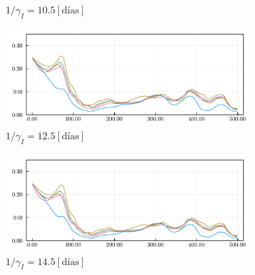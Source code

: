 \begin{figure}[H]
\begin{subfigure}[b]{.47\textwidth}
         \caption{\(1/\gamma_I = 10.5 [\text{días}]\)}
     \end{subfigure}
     \hfill
     \begin{subfigure}[b]{.47\textwidth}
         \centering
         \includegraphics[width=\textwidth]{img/resultados/sensigammai_12-5_0alphaini0-15_0-1_0-45_high1__acov0-8_aini0-27675_gcov0-05gamma_e_0-1724_gamma_i_0-1389_beta_2_2-0000.pdf}
         \caption{\(1/\gamma_I = 12.5 [\text{días}]\)}
     \end{subfigure}
     \hfill
     \begin{subfigure}[b]{.47\textwidth}
         \centering
         \includegraphics[width=\textwidth]{img/resultados/sensigammai_14-5_0alphaini0-15_0-1_0-45_high1__acov0-8_aini0-27675_gcov0-05gamma_e_0-1724_gamma_i_0-1389_beta_2_2-0000.pdf}
         \caption{\(1/\gamma_I = 14.5 [\text{días}]\)}
     \end{subfigure}
     \hfill
    \caption[Sensibilidad factor sanitario estimado para los datos reales, ante distintos \(\gamma_I\).]{}
    \label{sensi-gammai-real}
\end{figure}



